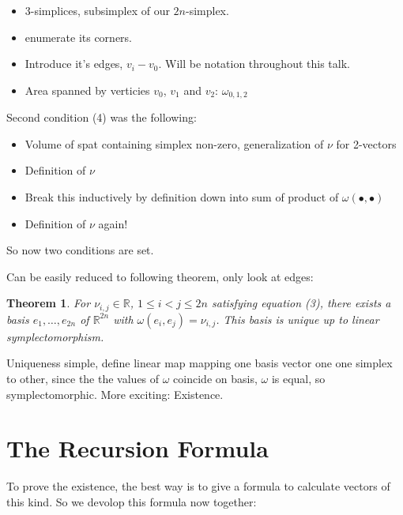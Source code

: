 \documentclass[12pt,a4paper]{scrartcl}
\newtheorem{theorem}{Theorem}[subsection]
\begin{document}
\begin{itemize}
  \item \( 3 \)-simplices, subsimplex of our \( 2n \)-simplex.
  \item enumerate its corners.
  \item Introduce it's edges, \( v_i - v_0 \). Will be notation throughout this talk.
  \item Area spanned by verticies \( v_0 \), \( v_1 \) and \( v_2 \): \( \omega_{0,1,2} \)
\end{itemize}

Second condition (4) was the following:

\begin{itemize}
  \item Volume of spat containing simplex non-zero, generalization of \( \nu \) for 2-vectors
  \item Definition of \( \nu \)
  \item Break this inductively by definition down into sum of product of \( \omega \left( \bullet, \bullet \right) \)
  \item Definition of \( \nu \) again!
\end{itemize}

So now two conditions are set.

Can be easily reduced to following theorem, only look at edges:

\begin{theorem}
  For \( \nu_{i,j} \in \mathbb{R} \), \( 1 \leq i < j \leq 2n \) satisfying equation (3), there exists a basis \( e_1, \dots, e_{2n} \) of \( \mathbb{R}^{2n} \) with \( \omega \left( e_i, e_j \right) = \nu_{i,j} \).
  This basis is unique up to linear symplectomorphism.
\end{theorem}

Uniqueness simple, define linear map mapping one basis vector one one simplex to other, since the the values of \( \omega \) coincide on basis, \( \omega \) is equal, so symplectomorphic. More exciting: Existence.


\section{The Recursion Formula}

To prove the existence, the best way is to give a formula to calculate vectors of this kind. So we devolop this formula now together:
\end{document}
